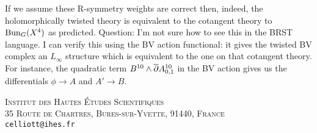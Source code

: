 \documentclass[10pt, oneside]{article}
\begin{document}
\begin{example}[8d $\mc N=1$ Super Yang-Mills]
\begin{enumerate}
If we assume these R-symmetry weights are correct then, indeed, the holomorphically twisted theory is equivalent to the cotangent theory to $\operatorname{Bun}_G(X^4)$ as predicted.  Question: I'm not sure how to see this in the BRST language.  I can verify this using the BV action functional: it gives the twisted BV complex an $L_\infty$ structure which is equivalent to the one on that cotangent theory.  For instance, the quadratic term $B^{10} \wedge \overline{\partial} A^{10}_{0,1}$ in the BV action gives us the differentials $\phi \to A$ and $A' \to B$.

\end{enumerate}

\end{example}




\pagestyle{bib}
\printbibliography

\textsc{Institut des Hautes \'Etudes Scientifiques}\\
\textsc{35 Route de Chartres, Bures-sur-Yvette, 91440, France}\\
\texttt{celliott@ihes.fr}
\end{document}
